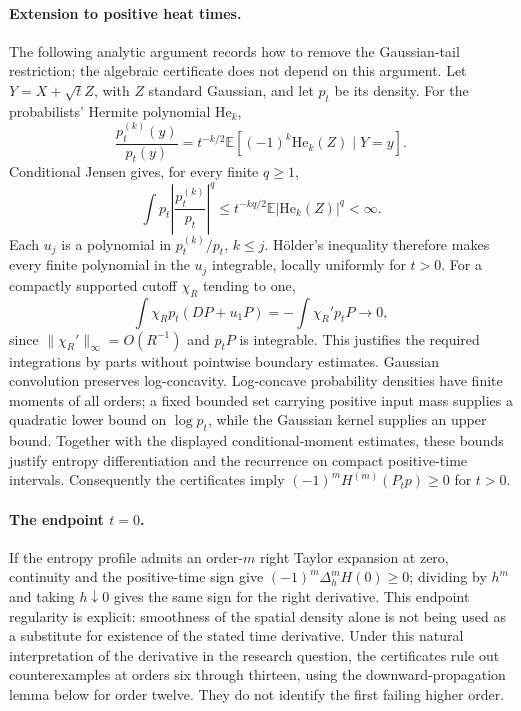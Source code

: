 \paragraph{Extension to positive heat times.}
The following analytic argument records how to remove the Gaussian-tail
restriction; the algebraic certificate does not depend on this argument.
Let $Y=X+\sqrt t Z$, with $Z$ standard Gaussian, and let $p_t$ be its density.
For the probabilists' Hermite polynomial $\mathrm{He}_k$,
\[
 \frac{p_t^{(k)}(y)}{p_t(y)}
 =t^{-k/2}\mathbb E[(-1)^k\mathrm{He}_k(Z)\mid Y=y].
\]
Conditional Jensen gives, for every finite $q\ge1$,
\[
 \int p_t\left|\frac{p_t^{(k)}}{p_t}\right|^q
 \le t^{-kq/2}\mathbb E|\mathrm{He}_k(Z)|^q<\infty.
\]
Each $u_j$ is a polynomial in $p_t^{(k)}/p_t$, $k\le j$.
H\"older's inequality therefore makes every finite polynomial in the $u_j$
integrable, locally uniformly for $t>0$.
For a compactly supported cutoff $\chi_R$ tending to one,
\[
 \int\chi_Rp_t(DP+u_1P)=-\int\chi_R'p_tP\longrightarrow0,
\]
since $\|\chi_R'\|_\infty=O(R^{-1})$ and $p_tP$ is integrable.
This justifies the required integrations by parts without pointwise boundary
estimates. Gaussian convolution preserves log-concavity. Log-concave
probability densities have finite moments of all orders; a fixed bounded
set carrying positive input mass supplies a quadratic lower bound on
$\log p_t$, while the Gaussian kernel supplies an upper bound. Together
with the displayed conditional-moment estimates, these bounds justify
entropy differentiation and the recurrence on compact positive-time intervals.
Consequently the certificates imply $(-1)^mH^{(m)}(P_tp)\ge0$ for $t>0$.

\paragraph{The endpoint $t=0$.}
If the entropy profile admits an order-$m$ right Taylor expansion at zero,
continuity and the positive-time sign give
$(-1)^m\Delta_h^m H(0)\ge0$; dividing by $h^m$ and taking $h\downarrow0$
gives the same sign for the right derivative. This endpoint regularity is
explicit: smoothness of the spatial density alone is not being used as a
substitute for existence of the stated time derivative. Under this natural
interpretation of the derivative in the research question, the certificates
rule out counterexamples at orders six through thirteen, using the downward-propagation lemma below for order twelve. They do not identify
the first failing higher order.


